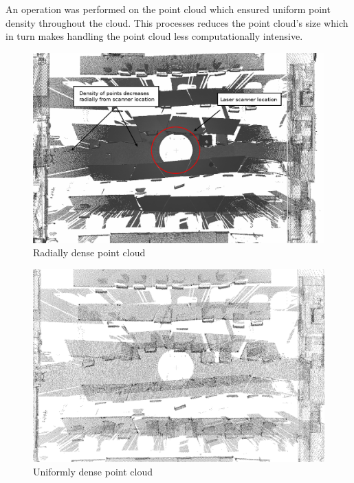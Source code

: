 \documentclass[11pt,a4paper]{report}
\begin{document}
						An operation was performed on the point cloud which ensured uniform point density throughout the cloud. This processes reduces the point cloud's size which in turn makes handling the point cloud less computationally intensive.
						\cite{_selection_????}
						
						\begin{figure}[h!]
							\centering
							\includegraphics[width=1\textwidth]{dense_point_cloud}
							\caption{Radially dense point cloud}
							\label{fig:dense_point_cloud}
						\end{figure}
						
						\begin{figure}[h!]
							\centering
							\includegraphics[width=1\textwidth]{uniform_point_cloud}
							\caption{Uniformly dense point cloud}
							\label{fig:uniform_point_cloud}
						\end{figure}
				
\end{document}
